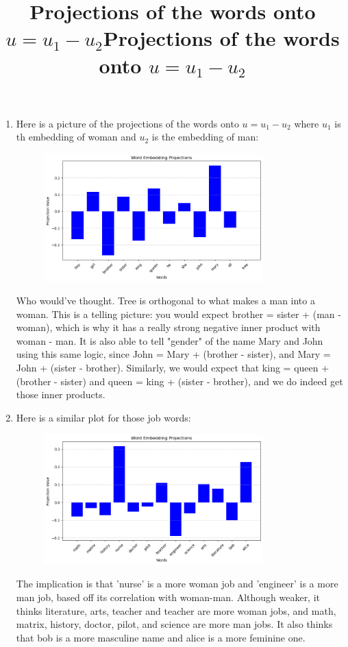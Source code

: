 \documentclass[12pt]{article}
\theoremstyle{definitionstyle}
\begin{document}
\begin{enumerate}[leftmargin=\labelsep]
\begin{enumerate}[label=\textbf{(\alph*)}]
                \item Here is a picture of the projections of the words onto $u = u_1-u_2$ where $u_1$ is th embedding of woman and $u_2$ is the embedding of man:
                \begin{figure}[H]
                    \centering
                    \includegraphics[width=0.8\textwidth]{man_woman_projs.png}
                    \title{Projections of the words onto $u = u_1-u_2$}
                \end{figure}
                Who would've thought. Tree is orthogonal to what makes a man into a woman. This is a telling picture: you would expect brother = sister + (man - woman), which is why it has a really strong negative inner product with woman - man. It is also able to tell "gender" of the name Mary and John using this same logic, since John = Mary + (brother - sister), and Mary = John + (sister - brother). Similarly, we would expect that king = queen + (brother - sister) and queen = king + (sister - brother), and we do indeed get those inner products. 
                
                \item Here is a similar plot for those job words:
                \begin{figure}[H]
                    \centering
                    \includegraphics[width=0.8\textwidth]{job_words.png}
                    \title{Projections of the words onto $u = u_1-u_2$}
                \end{figure}
                 The implication is that 'nurse' is a more woman job and 'engineer' is a more man job, based off its correlation with woman-man. Although weaker, it thinks literature, arts, teacher and teacher are more woman jobs, and math, matrix, history, doctor, pilot, and science are more man jobs. It also thinks that bob is a more masculine name and alice is a more feminine one. 
                

\end{enumerate}
\end{enumerate}
\end{document}
